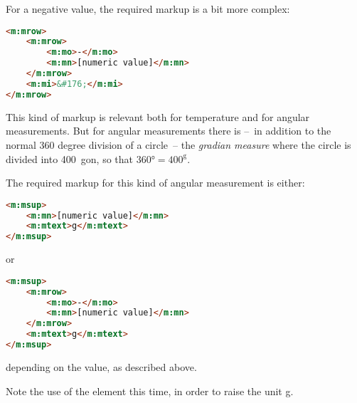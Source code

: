 \documentclass[english,a4paper,11pt]{article}
\begin{document}
\medskip
For a negative value, the required markup is a bit more complex:
\begin{lstlisting}[language=HTML]
<m:mrow>
	<m:mrow>
		<m:mo>-</m:mo>
		<m:mn>[numeric value]</m:mn>
	</m:mrow>
	<m:mi>&#176;</m:mi>
</m:mrow>
\end{lstlisting}


\medskip
This kind of markup is relevant both for  temperature and for angular measurements. But for angular measurements there is --~in addition to the normal 360 degree division of a circle~-- the \emph{gradian measure} where the circle is divided into 400~gon, so that $\ang{360} = 400^\text{g}$.

The required markup for this kind of angular measurement is either:
\begin{lstlisting}[language=HTML]
<m:msup>
	<m:mn>[numeric value]</m:mn>
	<m:mtext>g</m:mtext>
</m:msup>
\end{lstlisting}
or
\begin{lstlisting}[language=HTML]
<m:msup>
	<m:mrow>
		<m:mo>-</m:mo>
		<m:mn>[numeric value]</m:mn>
	</m:mrow>
	<m:mtext>g</m:mtext>
</m:msup>
\end{lstlisting}
depending on the value, as described above.

Note the use of the  element this time, in order to raise the unit g.
\end{document}

